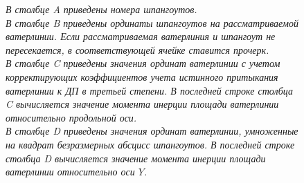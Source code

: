 \begin{figure}
    \centering
    \footnotesize
    \caption{Схема расчета моментов инерции площади ватерлинии относительно продольной и поперечной осей в табличном редакторе}
    \caption*{\itshape{
        В столбце A приведены номера шпангоутов.\\
        В столбце B приведены ординаты шпангоутов на рассматриваемой ватерлинии.
        Если рассматриваемая ватерлиния и шпангоут не пересекается, в соответствующей ячейке ставится прочерк.\\
        В столбце C приведены значения ординат ватерлинии с учетом корректирующих коэффициентов учета истинного притыкания ватерлинии к ДП в третьей степени.
        В последней строке столбца C вычисляется значение момента инерции площади ватерлинии относительно продольной оси.\\
        В столбце D приведены значения ординат ватерлинии, умноженные на квадрат безразмерных абсцисс шпангоутов.
        В последней строке столбца D вычисляется значение момента инерции площади ватерлинии относительно оси $Y$.}}
    \label{tab:inertia-elements}
\end{figure}  

